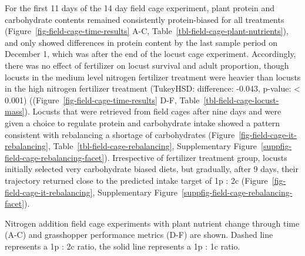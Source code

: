 \documentclass[
]{article}
\begin{document}
For the first 11 days of the 14 day field cage experiment, plant protein
and carbohydrate contents remained consistently protein-biased for all
treatments (Figure~\ref{fig-field-cage-time-results} A-C,
Table~\ref{tbl-field-cage-plant-nutrients}), and only showed differences
in protein content by the last sample period on December 1, which was
after the end of the locust cage experiment. Accordingly, there was no
effect of fertilizer on locust survival and adult proportion, though
locusts in the medium level nitrogen fertilizer treatment were heavier
than locusts in the high nitrogen fertilizer treatment (TukeyHSD:
difference: -0.043, p-value: \textless{} 0.001)
((Figure~\ref{fig-field-cage-time-results} D-F,
Table~\ref{tbl-field-cage-locust-mass}). Locusts that were retrieved
from field cages after nine days and were given a choice to regulate
protein and carbohydrate intake showed a pattern consistent with
rebalancing a shortage of carbohydrates
(Figure~\ref{fig-field-cage-it-rebalancing},
Table~\ref{tbl-field-cage-rebalancing},
Supplementary Figure~\ref{suppfig-field-cage-rebalancing-facet}).
Irrespective of fertilizer treatment group, locusts initially selected
very carbohydrate biased diets, but gradually, after 9 days, their
trajectory returned close to the predicted intake target of 1p : 2c
(Figure~\ref{fig-field-cage-it-rebalancing},
Supplementary Figure~\ref{suppfig-field-cage-rebalancing-facet}).

\begin{fig}


\caption{\label{fig-field-cage-time-results}Nitrogen addition field cage
experiments with plant nutrient change through time (A-C) and
grasshopper performance metrics (D-F) are shown. Dashed line represents
a 1p : 2c ratio, the solid line represents a 1p : 1c ratio.}

\end{fig}%
\end{document}
